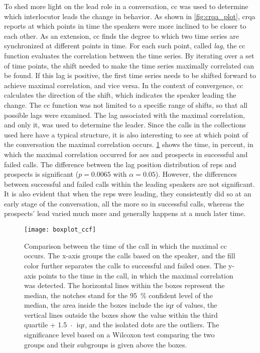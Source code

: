 To shed more light on the lead role in a conversation, \acl{cc} was used to determine which interlocutor leads the change in behavior.
As shown in \cref{fig:crqa_plot}, \ac{crqa} reports at which points in time the speakers were more inclined to be closer to each other.
As an extension, \acl{cc} finds the degree to which two time series are synchronized at different points in time.
For each such point, called \emph{lag}, the \acl{cc} function evaluates the correlation between the time series.
By iterating over a set of time points, the shift needed to make the time series maximally correlated can be found.
If this lag is positive, the first time series needs to be shifted forward to achieve maximal correlation, and vice versa.
In the context of convergence, \acl{cc} calculates the direction of the shift, which indicates the speaker leading the change.
The \acl{cc} function was not limited to a specific range of shifts, so that all possible lags were examined.
The lag associated with the maximal correlation, and only it, was used to determine the leader.
Since the calls in the collections used here have a typical structure, it is also interesting to see at which point of the conversation the maximal correlation occurs.
\cref{fig:barplot_conv_leaders} shows the time, in percent, in which the maximal correlation occurred for \acp{ae} and prospects in successful and failed calls.
The difference between the lag position distribution of reps and prospects is significant ($p = 0.0065$ with $\alpha = 0.05$).
However, the differences between successful and failed calls within the leading speakers are not significant.
It is also evident that when the reps were leading, they consistently did so at an early stage of the conversation, all the more so in successful calls, whereas the prospects' lead varied much more and generally happens at a much later time.

\begin{figure}[H]
	\centering
	\texttt{[image: boxplot\_ccf]}
	\caption[Comparison between sales reps' and prospects' maximal \acl{cc} point in conversation for successful and failed calls.]
		{Comparison between the time of the call in which the maximal \acl{cc} occurs.
		The x-axis groups the calls based on the speaker, and the fill color further separates the calls to successful and failed ones.
		The y-axis points to the time in the call, in which the maximal correlation was detected.
		The horizontal lines within the boxes represent the median,
		the notches stand for the \SI{95}{\percent} confident level of the median, the area inside the boxes include the \acf{iqr} of values, the vertical lines outside the boxes show the value within the third quartile + 1.5~$\protect\cdot$~\ac{iqr}, and the isolated dots are the outliers.
		The significance level based on a Wilcoxon test comparing the two groups and their subgroups is given above the boxes.}
	\label{fig:barplot_conv_leaders}
\end{figure}

